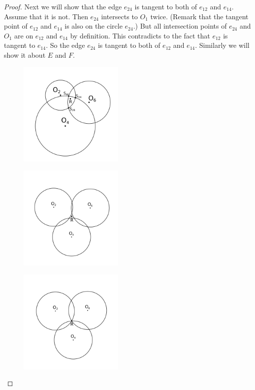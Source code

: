 \documentclass[suppldata, dvipdfmx]{interact}
\theoremstyle{plain}%
\theoremstyle{definition}
\theoremstyle{remark}
\theoremstyle{problemstyle}
\begin{document}
\begin{proof}
Next we will show that the edge $e_{24}$ is tangent to both of $e_{12}$ and
 $e_{14}$. Assume that it is not. Then $e_{24}$ intersects to $O_1$
 twice.
(Remark that the tangent point of $e_{12}$ and $e_{14}$ is also on the
 circle $e_{24}$.) But all intersection points of $e_{24}$ and $O_1$ are
 on $e_{12}$ and $e_{14}$ by definition. This contradicts to the fact
 that $e_{12}$ is tangent to $e_{14}$. So the edge $e_{24}$ is tangent
 to both of $e_{12}$ and $e_{14}$. Similarly we will show it about $E$
 and $F$.

\begin{figure}[h!tbp]
  \begin{minipage}[t]{0.3\textwidth}
   \centering
   \includegraphics[width=2in, keepaspectratio]{./img/HexahedraWithSphericalFaces/threeCircles1.png}
   \subcaption{}
   \label{fig:}
  \end{minipage}
 \hspace*{\fill}
  \begin{minipage}[t]{0.3\textwidth}
   \centering
   \includegraphics[width=2in, keepaspectratio]{./img/HexahedraWithSphericalFaces/threeCircles2.png}
   \subcaption{}
   \label{fig:}
  \end{minipage}
  \hspace*{\fill}
  \begin{minipage}[t]{0.3\textwidth}
   \centering
   \includegraphics[width=2in, keepaspectratio]{./img/HexahedraWithSphericalFaces/threeCircles3.png}
   \subcaption{}
   \label{fig:}
  \end{minipage}
  \caption{\textit{}}
  \label{fig:threeCircles}
\end{figure}



\end{proof}
\end{document}
